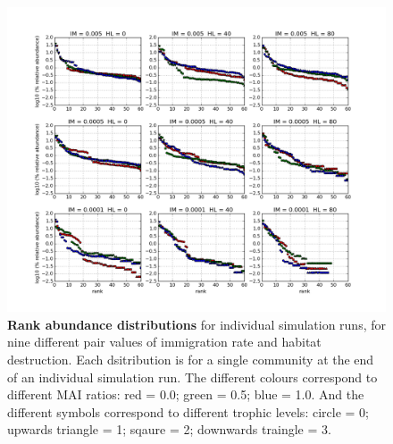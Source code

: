 \begin{itemize}
{\begin{figure}
        \includegraphics[width=\linewidth]{"./chapters/chapter04/figures/single_rads"}
        \caption{\textbf{Rank abundance distributions} for individual simulation runs, for nine different pair values of immigration rate and habitat destruction. Each dsitribution is for a single community at the end of an individual simulation run. The different colours correspond to different MAI ratios: red = 0.0; green = 0.5; blue = 1.0. And the different symbols correspond to different trophic levels: circle = 0; upwards triangle = 1; sqaure = 2; downwards traingle = 3.}
        \label{fig:single_run_rads}
\end{figure}
}

\afterpage{%
\thispagestyle{empty}
\begin{figure}

		\centering      
		\hspace{-3cm}


\end{figure}}
\end{itemize}

